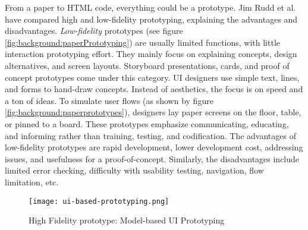 From a paper to HTML code, everything could be a prototype.
Jim Rudd et al. \cite{article:prototyping:highlowfidelity} have compared high and low-fidelity prototyping, explaining the advantages and disadvantages.
\textit{Low-fidelity} prototypes (see figure \ref{fig:background:paperPrototyping}) are usually limited functions, with little interaction prototyping effort. They mainly focus on explaining concepts, design alternatives, and screen layouts. 
Storyboard presentations, cards, and proof of concept prototypes come under this category.
UI designers use simple text, lines, and forms to hand-draw concepts. 
Instead of aesthetics, the focus is on speed and a ton of ideas.
To simulate user flows (as shown by figure \ref{fig:background:paperprototypes}), designers lay paper screens on the floor, table, or pinned to a board.
These prototypes emphasize communicating, educating, and informing rather than training, testing, and codification.
The advantages of low-fidelity prototypes are rapid development, lower development cost, addressing issues, and usefulness for a proof-of-concept.
Similarly, the disadvantages include limited error checking, difficulty with usability testing, navigation, flow limitation, etc.
\begin{figure}[htbp!]
  \centering    
  \texttt{[image: ui-based-prototyping.png]}
  \caption[High Fidelity prototyping]{High Fidelity prototype: Model-based UI Prototyping}
  \label{fig:background:uiPrototyping}
\end{figure}

